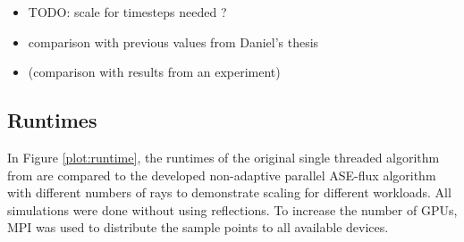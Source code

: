 \begin{itemize}
  \item TODO: scale for timesteps needed ?

  \item comparison with previous values from Daniel's thesis

  \item (comparison with results from an experiment)

\end{itemize}


\subsection{Runtimes}
In Figure \ref{plot:runtime}, the runtimes of the original single threaded
algorithm from \cite{ASE2010} are compared to the developed non-adaptive
parallel ASE-flux algorithm with different numbers of rays to demonstrate
scaling for different workloads. All simulations were done without using
reflections. To increase the number of GPUs, MPI\cite{MPI} was used to distribute the
sample points to all available devices. 

